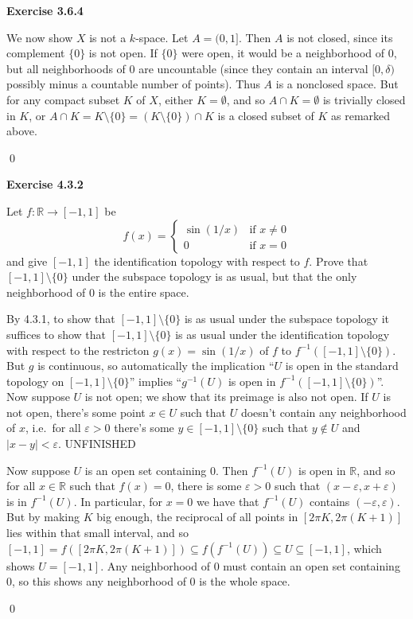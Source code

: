 \documentclass[12pt]{article}
\newcommand{\qcolor}{Gray}
\newcommand{\acolor}{Black}
\newcommand{\R}{\mathbb{R}}
\newcommand{\abs}[1]{\left|#1\right|}
\newcommand{\question}[1]{
	\color{\qcolor} 
	\item[#1~]}
\newcommand{\answer}[0]{
	\color{\acolor} 
	\item[]}
\newenvironment{exercise}[1]
{
	{
		\Large
		\color{\acolor}
		\addtolength\leftskip{-2em}
		\textbf{Exercise #1}
		
	}
	\begin{list}{}
	{
		\setlength\leftmargin{1em}
		\setlength\rightmargin{0em}
		\setlength\labelwidth{2em}
		\setlength\itemsep{0em}
		\setlength\parsep{0.5em}
		\setlength\baselineskip{1.25em}
	}
}
{
  \qed{}
  \end{list}
}
\begin{document}
\begin{exercise}{3.6.4}
  We now show $X$ is not a $k$-space. Let $A = (0, 1]$. Then $A$ is not closed, since its complement $\{0\}$ is not open. If $\{0\}$ were open, it would be a neighborhood of $0$, but all neighborhoods of $0$ are uncountable (since they contain an interval $[0, \delta)$ possibly minus a countable number of points). Thus $A$ is a nonclosed space. But for any compact subset $K$ of $X$, either $K = \emptyset$, and so $A \cap K = \emptyset$ is trivially closed in $K$, or $A \cap K = K \setminus \{0\} = (K \setminus \{0\}) \cap K$ is a closed subset of $K$ as remarked above.
\end{exercise}

\begin{exercise}{4.3.2}
  \question{} Let $f : \R \to [-1, 1]$ be
  $$f(x) = \begin{cases}
    \sin(1/x) &\text{if } x \neq 0 \\
    0 &\text{if } x = 0
  \end{cases}$$
  and give $[-1,1]$ the identification topology with respect to $f$. Prove that $[-1, 1] \setminus \{0\}$ under the subspace topology is as usual, but that the only neighborhood of $0$ is the entire space.
  \answer
  By 4.3.1, to show that $[-1, 1] \setminus \{0\}$ is as usual under the subspace topology it suffices to show that $[-1, 1] \setminus \{0\}$ is as usual under the identification topology with respect to the restricton $g(x) = \sin(1/x)$ of $f$ to $f^{-1}([-1, 1] \setminus \{0\})$. But  $g$ is continuous, so automatically the implication ``$U$ is open in the standard topology on $[-1, 1] \setminus \{0\}$'' implies ``$g^{-1}(U)$ is open in $f^{-1}([-1, 1] \setminus \{0\})$''. Now suppose $U$ is not open; we show that its preimage is also not open. If $U$ is not open, there's some point $x \in U$ such that $U$ doesn't contain any neighborhood of $x$, i.e.\ for all $\varepsilon > 0$ there's some $y \in [-1, 1] \setminus \{0\}$ such that $y \notin U$ and $\abs{x - y} < \varepsilon$. {\color{red} UNFINISHED} 

  Now suppose $U$ is an open set containing $0$. Then $f^{-1}(U)$ is open in $\R$, and so for all $x \in \R$ such that $f(x) = 0$, there is some $\varepsilon > 0$ such that $(x - \varepsilon, x + \varepsilon)$ is in $f^{-1}(U)$. In particular, for $x = 0$ we have that $f^{-1}(U)$ contains $(-\varepsilon, \varepsilon)$. But by making $K$ big enough, the reciprocal of all points in $[2 \pi K, 2\pi(K+1)]$ lies within that small interval, and so $[-1, 1] = f([2 \pi K, 2\pi(K+1)]) \subseteq f(f^{-1}(U)) \subseteq U \subseteq [-1, 1]$, which shows $U = [-1, 1]$. Any neighborhood of $0$ must contain an open set containing $0$, so this shows any neighborhood of $0$ is the whole space.
\end{exercise}
\end{document}

